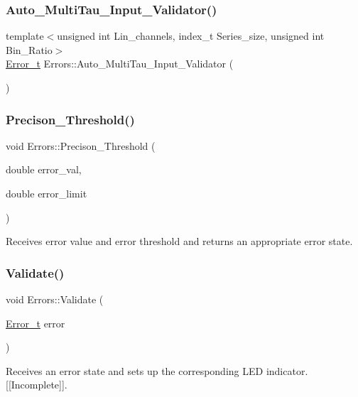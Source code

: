 \subsubsection{\texorpdfstring{Auto\+\_\+\+Multi\+Tau\+\_\+\+Input\+\_\+\+Validator()}{Auto\_MultiTau\_Input\_Validator()}}
{\footnotesize\ttfamily template$<$unsigned int Lin\+\_\+channels, index\+\_\+t Series\+\_\+size, unsigned int Bin\+\_\+\+Ratio$>$ \\
\hyperlink{errors_8hpp_a4e8c0d09726859e3d3369c0da5a1aa7f}{Error\+\_\+t} Errors\+::\+Auto\+\_\+\+Multi\+Tau\+\_\+\+Input\+\_\+\+Validator (\begin{DoxyParamCaption}{ }\end{DoxyParamCaption})}

\mbox{\label{namespaceErrors_a0caff7c325638cca6f2f4ebdb0bf81a2}} 
\subsubsection{\texorpdfstring{Precison\+\_\+\+Threshold()}{Precison\_Threshold()}}
{\footnotesize\ttfamily void Errors\+::\+Precison\+\_\+\+Threshold (\begin{DoxyParamCaption}\item[{double}]{error\+\_\+val,  }\item[{double}]{error\+\_\+limit }\end{DoxyParamCaption})}



Receives error value and error threshold and returns an appropriate error state. 

\mbox{\label{namespaceErrors_a51461dff689e5f46ea124f1e13806c01}} 
\subsubsection{\texorpdfstring{Validate()}{Validate()}}
{\footnotesize\ttfamily void Errors\+::\+Validate (\begin{DoxyParamCaption}\item[{\hyperlink{errors_8hpp_a4e8c0d09726859e3d3369c0da5a1aa7f}{Error\+\_\+t}}]{error }\end{DoxyParamCaption})}



Receives an error state and sets up the corresponding L\+ED indicator. \mbox{[}\mbox{[}Incomplete\mbox{]}\mbox{]}. 

